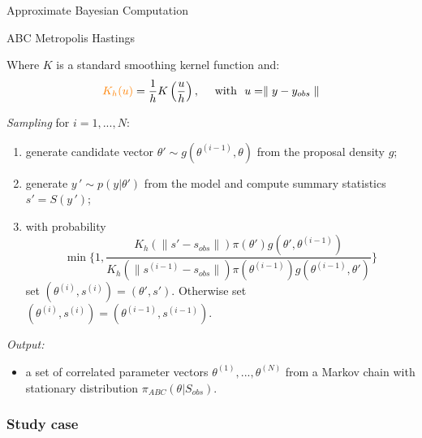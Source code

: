 \documentclass{beamer}
\begin{document}
\begin{section}{Approximate Bayesian Computation}
\begin{frame}{ABC Metropolis Hastings}
{ 
 \vspace{0.7cm}
 Where $K$ is a standard smoothing kernel function and:
 \[ \textcolor{orange}{K_h(u)}  =  \frac{1}{h}  K \left( \frac{u}{h} \right), \quad \text{ with } \  u=\parallel y-y_{obs} \parallel \]
 
 

}


 {
	\emph{Sampling} for $i=1,...,N$:
	\begin{enumerate}
		\item generate candidate vector $\theta' \sim g(\theta^{(i-1)},\theta)$ from the proposal density $g$;
		\item generate $ y\,' \sim p(y|\theta')$ from the model and compute summary statistics  $s' = S(y\,')$;
		\item with probability $$\min \{ 1, \frac{K_h(\parallel s'-s_{obs}\parallel)   \pi(\theta')g(\theta',\theta^{(i-1)})}{K_h(\parallel s^{(i-1)}-s_{obs}\parallel)   \pi(\theta^{(i-1)})g(\theta^{(i-1)},\theta') } \}$$ 
		set $(\theta^{(i)},s^{(i)})=(	\theta',s')$. 
		Otherwise set  $(\theta^{(i)},s^{(i)})=(\theta^{(i-1)},s^{(i-1)})$.
	\end{enumerate}
	
	\emph{Output:}
	\begin{itemize}
		\item a set of correlated parameter vectors $\theta ^ {(1)},..., \theta ^ {(N)}$ from a Markov chain with stationary distribution $\pi_{ABC}(\theta |S_{obs})$.
	\end{itemize}
}
\end{frame}



\begin{frame}
\frametitle{Study case}
\end{frame}
\end{section}
\end{document}
